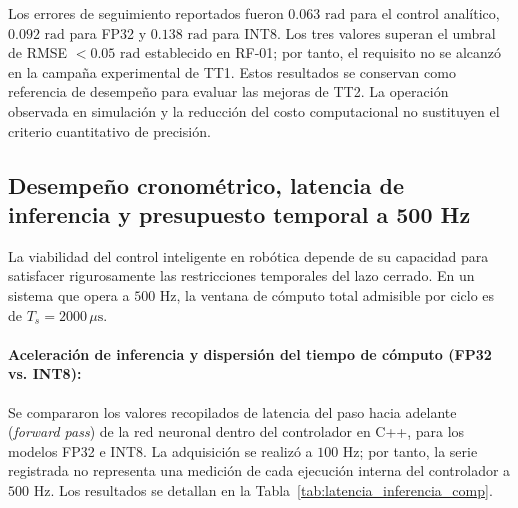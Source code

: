 \documentclass[12pt]{article}
\begin{document}
Los errores de seguimiento reportados fueron $0.063\text{ rad}$ para el control analítico, $0.092\text{ rad}$ para FP32 y $0.138\text{ rad}$ para INT8. Los tres valores superan el umbral de RMSE $<0.05\text{ rad}$ establecido en RF-01; por tanto, el requisito no se alcanzó en la campaña experimental de TT1. Estos resultados se conservan como referencia de desempeño para evaluar las mejoras de TT2. La operación observada en simulación y la reducción del costo computacional no sustituyen el criterio cuantitativo de precisión.

\subsection{Desempeño cronométrico, latencia de inferencia y presupuesto temporal a 500 Hz}
\label{sec:desempeno_cronometrico}

La viabilidad del control inteligente en robótica depende de su capacidad para satisfacer rigurosamente las restricciones temporales del lazo cerrado. En un sistema que opera a $500\text{ Hz}$, la ventana de cómputo total admisible por ciclo es de $T_s = 2000\,\mu\text{s}$. 

\paragraph*{Aceleración de inferencia y dispersión del tiempo de cómputo (FP32 vs. INT8):}
Se compararon los valores recopilados de latencia del paso hacia adelante (\textit{forward pass}) de la red neuronal dentro del controlador en C++, para los modelos FP32 e INT8. La adquisición se realizó a $100\text{ Hz}$; por tanto, la serie registrada no representa una medición de cada ejecución interna del controlador a $500\text{ Hz}$. Los resultados se detallan en la Tabla~\ref{tab:latencia_inferencia_comp}.
\end{document}

